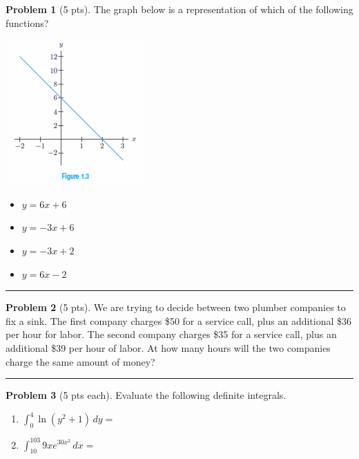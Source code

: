 \documentclass[12pt]{article}
\makeatletter
\theoremstyle{definition}
\newtheorem{problem}{Problem}
\newcommand*{\radiobutton}{%
  \@ifstar{\@radiobutton0}{\@radiobutton1}%
}
\newcommand*{\@radiobutton}[1]{%
  \begin{tikzpicture}
    \pgfmathsetlengthmacro\radius{height("X")/2}
    \draw[radius=\radius] circle;
    \ifcase#1 \fill[radius=.6*\radius] circle;\fi
  \end{tikzpicture}%
}
\makeatother
\begin{document}
\begin{problem}[5 pts]
The graph below is a representation of which of the following functions?
\begin{multicols}{2}
\begin{center}
\includegraphics{1graph2.png}
\end{center}
\begin{itemize}
\item[\radiobutton] $y=6x+6$
\item[\radiobutton] $y=-3x+6$
\item[\radiobutton] $y=-3x+2$
\item[\radiobutton] $y=6x-2$
\end{itemize}
\end{multicols}
\end{problem}

\hrule
\begin{problem}[5 pts]
  We are trying to decide between two plumber companies to fix a sink.  The first company charges \$50 for a service
  call, plus an additional \$36 per hour for labor.  The second company charges \$35 for a service call, plus an
  additional \$39 per hour of labor. At how many hours will the two companies charge the same amount of money?

  \vspace{4cm}
\end{problem}
\hrule

\begin{problem}[5 pts each]
Evaluate the following definite integrals.
\begin{enumerate}
\item $\displaystyle{\int_{0}^{4} \ln(y^2 + 1) \, dy} = $
\item $\displaystyle{\int_{10}^{103} 9xe^{30x^2}\, dx = }$
\vspace{7cm}
\end{enumerate}
\end{problem}
\end{document}
